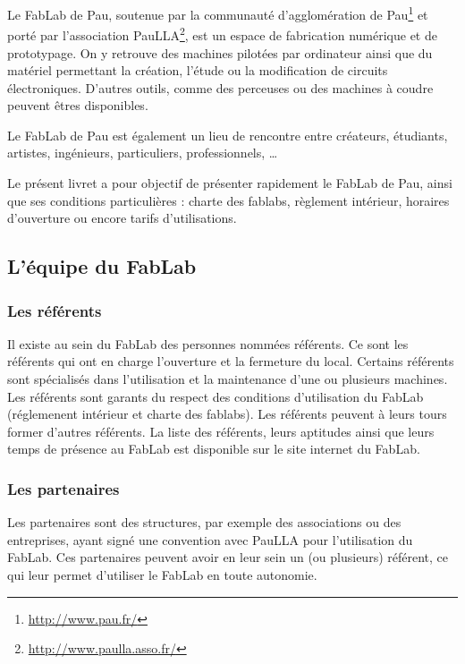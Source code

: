 Le FabLab de Pau, soutenue par la communauté d'agglomération de Pau\footnote{\url{http://www.pau.fr/}} et porté par l'association PauLLA\footnote{\url{http://www.paulla.asso.fr/}}, est un espace de fabrication numérique et de prototypage. On y retrouve des machines pilotées par ordinateur ainsi que du matériel permettant la création, l'étude  ou la modification de circuits électroniques. D'autres outils, comme des perceuses ou des machines à coudre peuvent êtres disponibles.

Le FabLab de Pau est également un lieu de rencontre entre créateurs, étudiants, artistes, ingénieurs, particuliers, professionnels, \dots 

Le présent livret a pour objectif de présenter rapidement le FabLab de Pau, ainsi que ses conditions particulières : charte des fablabs, règlement intérieur, horaires d'ouverture ou encore tarifs d'utilisations.


\subsection{L'équipe du FabLab}
\subsubsection{Les référents}
Il existe au sein du FabLab des personnes nommées référents.
Ce sont les référents qui ont en charge l'ouverture et la fermeture du local.
Certains référents sont spécialisés dans l'utilisation et la maintenance d'une ou plusieurs machines.
Les référents sont garants du respect des conditions d'utilisation du FabLab (réglemenent intérieur et charte des fablabs).
Les référents peuvent à leurs tours former d'autres référents.
La liste des référents, leurs aptitudes ainsi que leurs temps de présence au FabLab est disponible sur le site internet du FabLab. %

\subsubsection{Les partenaires}
Les partenaires sont des structures, par exemple des associations ou des entreprises, ayant signé une convention avec PauLLA pour l'utilisation du FabLab.
Ces partenaires peuvent avoir en leur sein un (ou plusieurs) référent, ce qui leur permet d'utiliser le FabLab en toute autonomie.

